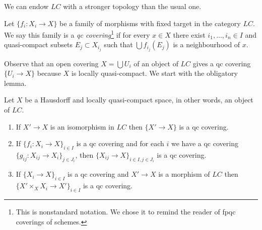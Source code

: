 \noindent
We can endow $\textit{LC}$ with a stronger topology than the usual one.

\begin{definition}
\label{definition-covering-LC}
Let $\{f_i : X_i \to X\}$ be a family of morphisms with fixed target
in the category $\textit{LC}$. We say this family is a
{\it qc covering}\footnote{This is nonstandard notation.
We chose it to remind the reader of fpqc coverings of schemes.}
if for every $x \in X$ there exist $i_1, \ldots, i_n \in I$ and
quasi-compact subsets $E_j \subset X_{i_j}$ such that
$\bigcup f_{i_j}(E_j)$ is a neighbourhood of $x$.
\end{definition}

\noindent
Observe that an open covering $X = \bigcup U_i$ of an object of $\textit{LC}$
gives a qc covering $\{U_i \to X\}$ because $X$ is locally quasi-compact.
We start with the obligatory lemma.

\begin{lemma}
\label{lemma-qc}
Let $X$ be a Hausdorff and locally quasi-compact space, in other words,
an object of $\textit{LC}$.
\begin{enumerate}
\item If $X' \to X$ is an isomorphism in $\textit{LC}$ then
$\{X' \to X\}$ is a qc covering.
\item If $\{f_i : X_i \to X\}_{i\in I}$ is a qc covering and for each
$i$ we have a qc covering $\{g_{ij} : X_{ij} \to X_i\}_{j\in J_i}$, then
$\{X_{ij} \to X\}_{i \in I, j\in J_i}$ is a qc covering.
\item If $\{X_i \to X\}_{i\in I}$ is a qc covering
and $X' \to X$ is a morphism of $\textit{LC}$ then
$\{X' \times_X X_i \to X'\}_{i\in I}$ is a qc covering.
\end{enumerate}
\end{lemma}

